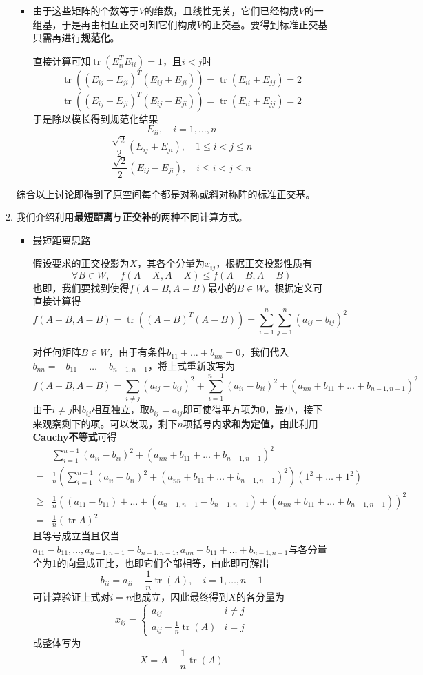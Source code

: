 \documentclass[a4paper,UTF8,fontset=windows,AutoFakeBold]{ctexart}
\DeclareMathOperator{\tr}{tr}
\begin{document}
\begin{enumerate}
\begin{enumerate}
\begin{itemize}
            \item 由于这些矩阵的个数等于$V$的维数，且线性无关，它们已经构成$V$的一组基，于是再由相互正交可知它们构成$V$的正交基。要得到标准正交基只需再进行\textbf{规范化}。
            
            直接计算可知$\tr(E_{ii}^TE_{ii})=1$，且$i<j$时
            $$\tr((E_{ij}+E_{ji})^T(E_{ij}+E_{ji}))=\tr(E_{ii}+E_{jj})=2$$
            $$\tr((E_{ij}-E_{ji})^T(E_{ij}-E_{ji}))=\tr(E_{ii}+E_{jj})=2$$
            于是除以模长得到规范化结果
            $$E_{ii},\quad i=1,\dots,n$$
            $$\frac{\sqrt2}{2}(E_{ij}+E_{ji}),\quad 1\le i<j\le n$$
            $$\frac{\sqrt2}{2}(E_{ij}-E_{ji}),\quad i\le i<j\le n$$
        \end{itemize}
        综合以上讨论即得到了原空间每个都是对称或斜对称阵的标准正交基。

        \item
        我们介绍利用\textbf{最短距离}与\textbf{正交补}的两种不同计算方式。

        \begin{itemize}
            \item 最短距离思路
            
            假设要求的正交投影为$X$，其各个分量为$x_{ij}$，根据正交投影性质有
            $$\forall B\in W,\quad f(A-X,A-X)\le f(A-B,A-B)$$
            也即，我们要找到使得$f(A-B,A-B)$最小的$B\in W$。根据定义可直接计算得
            $$f(A-B,A-B)=\tr((A-B)^T(A-B))=\sum_{i=1}^n\sum_{j=1}^n(a_{ij}-b_{ij})^2$$

            对任何矩阵$B\in W$，由于有条件$b_{11}+\dots+b_{nn}=0$，我们代入$b_{nn}=-b_{11}-\dots-b_{n-1,n-1}$，将上式重新改写为
            $$f(A-B,A-B)=\sum_{i\ne j}(a_{ij}-b_{ij})^2+\sum_{i=1}^{n-1}(a_{ii}-b_{ii})^2+(a_{nn}+b_{11}+\dots+b_{n-1,n-1})^2$$
            由于$i\ne j$时$b_{ij}$相互独立，取$b_{ij}=a_{ij}$即可使得平方项为0，最小，接下来观察剩下的项。可以发现，剩下$n$项括号内\textbf{求和为定值}，由此利用\textbf{Cauchy不等式}可得
            $$\begin{aligned}&\sum_{i=1}^{n-1}(a_{ii}-b_{ii})^2+(a_{nn}+b_{11}+\dots+b_{n-1,n-1})^2\\=&\frac{1}{n}(\sum_{i=1}^{n-1}(a_{ii}-b_{ii})^2+(a_{nn}+b_{11}+\dots+b_{n-1,n-1})^2)(1^2+\dots+1^2)\\\ge&\frac{1}{n}((a_{11}-b_{11})+\dots+(a_{n-1,n-1}-b_{n-1,n-1})+(a_{nn}+b_{11}+\dots+b_{n-1,n-1}))^2\\=&\frac{1}{n}(\tr A)^2\end{aligned}$$
            且等号成立当且仅当$a_{11}-b_{11},\dots,a_{n-1,n-1}-b_{n-1,n-1},a_{nn}+b_{11}+\dots+b_{n-1,n-1}$与各分量全为1的向量成正比，也即它们全部相等，由此即可解出
            $$b_{ii}=a_{ii}-\frac{1}{n}\tr(A),\quad i=1,\dots,n-1$$
            可计算验证上式对$i=n$也成立，因此最终得到$X$的各分量为
            $$x_{ij}=\begin{cases}a_{ij}&i\ne j\\a_{ij}-\frac{1}{n}\tr(A)&i=j\end{cases}$$
            或整体写为
            $$X=A-\frac{1}{n}\tr(A)$$


\end{itemize}
\end{enumerate}
\end{enumerate}
\end{document}
